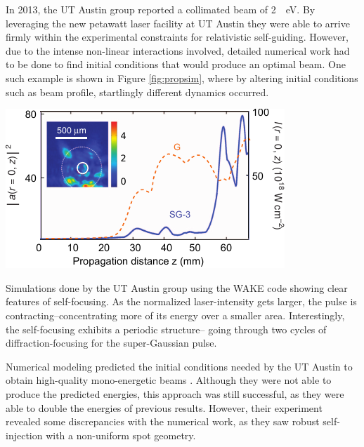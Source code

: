 \documentclass[12pt,letter]{article}
\begin{document}
In 2013, the UT Austin group reported a collimated beam of \SI{2}{\giga
\electronvolt}\cite{Wang2013}. By leveraging the new petawatt laser facility at
UT Austin they were able to arrive
firmly within the experimental constraints for relativistic self-guiding.
However, due to the intense non-linear interactions involved, detailed numerical
work had to be done to find initial conditions that would produce an optimal
beam. One such example is shown in Figure
\ref{fig:propsim}\cite{Wang2013}, where by altering initial conditions such as beam
profile, startlingly different dynamics occurred. 
\begin{marginfigure}
	\includegraphics[width=\marginparwidth]{../figures/wakesimulation.pdf}
    \caption{Simulations done by the UT Austin group using the WAKE
        code showing clear features of self-focusing.\cite{Wang2013} As the
        normalized laser-intensity gets larger, the pulse is
        contracting--concentrating more of its energy over a smaller area.
        Interestingly, the self-focusing exhibits a periodic structure-- going
        through two cycles of diffraction-focusing for the super-Gaussian
    pulse.\label{fig:propsim}}
\end{marginfigure}



Numerical modeling predicted the initial conditions needed by the UT Austin to obtain high-quality mono-energetic
beams \cite{kalmykov2010numerical}. Although they were not able to produce the predicted energies,
this approach was still successful, as they were able to double the energies
of previous results\cite{PhysRevLett.113.245001}. However, their experiment
revealed some discrepancies with the numerical work, as they saw robust
self-injection with a non-uniform spot geometry.
\end{document}
